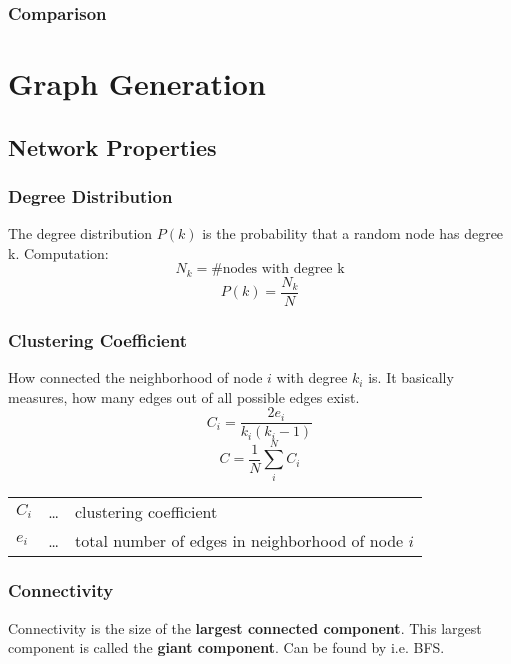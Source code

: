 \documentclass[parskip=full]{scrartcl}
\begin{document}
\subsubsection{Comparison}


\section{Graph Generation}

\subsection{Network Properties}

\subsubsection{Degree Distribution}
The degree distribution \textbf{$P(k)$} is the probability that a random node has degree k.\newline
Computation:
\[N_k = \text{\#nodes with degree k}\]
\[P(k) = \frac{N_k}{N}\]

\subsubsection{Clustering Coefficient}
How connected the neighborhood of node $i$ with degree $k_i$ is. It basically measures, how many edges out of all possible edges exist.
\[C_i = \frac{2e_i}{k_i\left(k_i-1\right)}\]
\[C = \frac{1}{N} \sum_{i}^{N} C_i\]
\begin{center}
\begin{tabular}{l c l}
	$C_i$ & \dots & clustering coefficient \\
	$e_i$ & \dots & total number of edges in neighborhood of node $i$
\end{tabular}
\end{center}

\subsubsection{Connectivity}
Connectivity is the size of the \textbf{largest connected component}.
This largest component is called the \textbf{giant component}.
Can be found by i.e. BFS.
\end{document}
